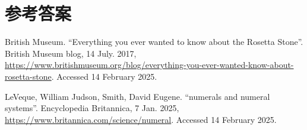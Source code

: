 \documentclass[b5paper]{ctexart}
\begin{document}
\ifx\wholebook\relax \else
\section{参考答案}
\shipoutAnswer

\begin{thebibliography}{99}

British Museum. ``Everything you ever wanted to know about the Rosetta Stone''. British Museum blog, 14 July. 2017, \url{https://www.britishmuseum.org/blog/everything-you-ever-wanted-know-about-rosetta-stone}. Accessed 14 February 2025.

LeVeque, William Judson, Smith, David Eugene. ``numerals and numeral systems''. Encyclopedia Britannica, 7 Jan. 2025, \url{https://www.britannica.com/science/numeral}. Accessed 14 February 2025.




\end{thebibliography}

\expandafter\enddocument

\fi
\end{document}
